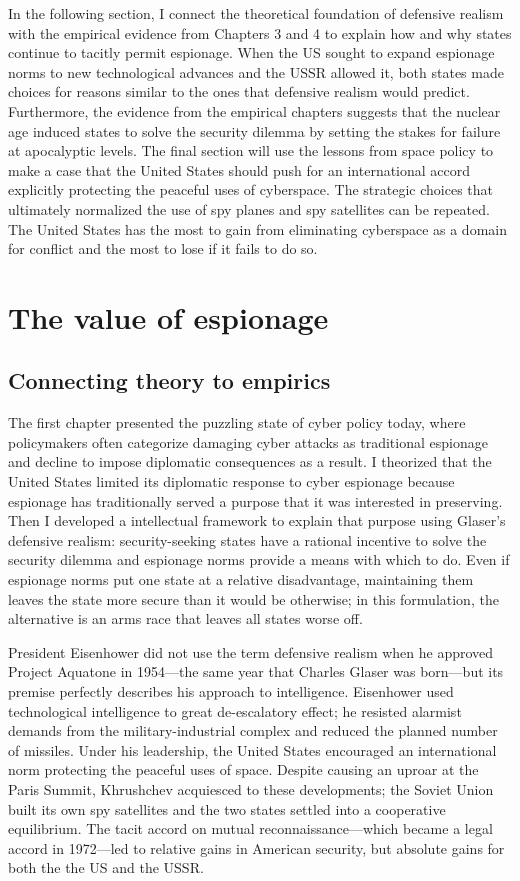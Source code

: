 \documentclass[11pt]{memoir}
\begin{document}
In the following section, I connect the theoretical foundation of defensive realism with the empirical evidence from Chapters 3 and 4 to explain how and why states continue to tacitly permit espionage. When the US sought to expand espionage norms to new technological advances and the USSR allowed it, both states made choices for reasons similar to the ones that defensive realism would predict. Furthermore, the evidence from the empirical chapters suggests that the nuclear age induced states to solve the security dilemma by setting the stakes for failure at apocalyptic levels. The final section will use the lessons from space policy to make a case that the United States should push for an international accord explicitly protecting the peaceful uses of cyberspace. The strategic choices that ultimately normalized the use of spy planes and spy satellites can be repeated. The United States has the most to gain from eliminating cyberspace as a domain for conflict and the most to lose if it fails to do so.

\section{The value of espionage}
\subsection{Connecting theory to empirics}
The first chapter presented the puzzling state of cyber policy today, where policymakers often categorize damaging cyber attacks as traditional espionage and decline to impose diplomatic consequences as a result. I theorized that the United States limited its diplomatic response to cyber espionage because espionage has traditionally served a purpose that it was interested in preserving. Then I developed a intellectual framework to explain that purpose using Glaser's defensive realism: security-seeking states have a rational incentive to solve the security dilemma and espionage norms provide a means with which to do. Even if espionage norms put one state at a relative disadvantage, maintaining them leaves the state more secure than it would be otherwise; in this formulation, the alternative is an arms race that leaves all states worse off.

President Eisenhower did not use the term defensive realism when he approved Project Aquatone in 1954---the same year that Charles Glaser was born---but its premise perfectly describes his approach to intelligence. Eisenhower used technological intelligence to great de-escalatory effect; he resisted alarmist demands from the military-industrial complex and reduced the planned number of missiles. Under his leadership, the United States encouraged an international norm protecting the peaceful uses of space. Despite causing an uproar at the Paris Summit, Khrushchev acquiesced to these developments; the Soviet Union built its own spy satellites and the two states settled into a cooperative equilibrium. The tacit accord on mutual reconnaissance---which became a legal accord in 1972---led to relative gains in American security, but absolute gains for both the the US and the USSR.
\end{document}
